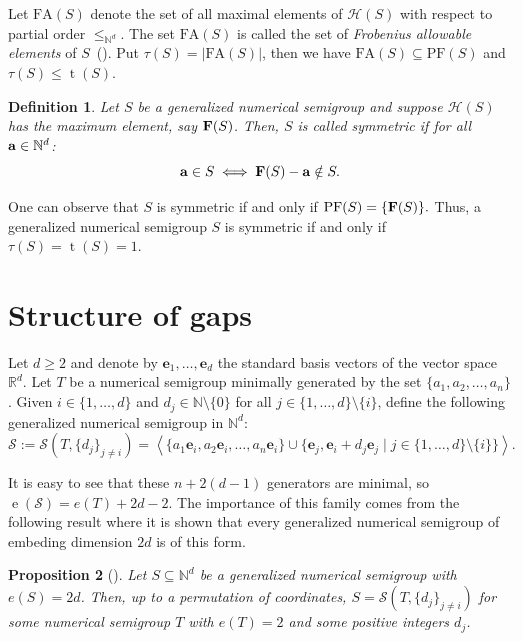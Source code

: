 \documentclass[12pt]{amsart}
\newcommand{\numberset}{\mathbb}
\newcommand{\N}{\numberset{N}}
\theoremstyle{plain}
\theoremstyle{theorem}
\newtheorem{definition}{Definition}[section]
\newtheorem{proposition}[definition]{Proposition}
\theoremstyle{remark}
\begin{document}
Let $\mathrm{FA}(S)$ denote the set of all maximal elements of $\mathcal{H}(S)$ with respect to partial order $\leq_{\mathbb{N}^d}$. The set $\mathrm{FA}(S)$ is called the set of \textit{Frobenius allowable elements} of $S$~(\cite{Singhal-Lin2022}). Put $\tau(S) = \vert \mathrm{FA}(S) \vert$, then we have $\mathrm{FA}(S)\subseteq  \mathrm{PF}(S)$ and $\tau(S) \leq \operatorname{t}(S)$.



\begin{definition}
	{\rm Let $S$ be a generalized numerical semigroup and suppose $\mathcal{H}(S)$ has the maximum element, say ${\bf F}(S)$. Then, $S$ is called \textit{symmetric}  if for all ${\bf a} \in \mathbb{N}^d$: $${\bf a} \in S \iff {\bf F}(S) - {\bf a} \notin S.$$
	}
\end{definition}

 One can observe that $S$ is symmetric if and only if $\mathrm{PF}(S) = \{{\bf F}(S)\}.$ Thus, a generalized numerical semigroup $S$ is symmetric if and only if  $\tau(S) = \operatorname{t}(S) = 1.$






\section{Structure of gaps}\label{sec:gaps}

Let $d\geq 2$ and denote by $\mathbf{e}_1,\ldots,\mathbf{e}_d$ the standard basis vectors of the vector space $\mathbb{R}^d$. Let $T$ be a numerical semigroup minimally generated by the set $\{a_1,a_2, \ldots,a_n\}$. 
Given $i\in \{1,\ldots,d\}$ and  $d_j\in \mathbb{N}\setminus \{0\}$ for all $j\in \{1,\ldots,d\}\setminus \{i\}$, define the following generalized numerical semigroup in $\mathbb{N}^d$:
$$\mathcal{S}:= \mathcal{S}(T,\{d_j\}_{j\neq i})=\left\langle \{a_1 \mathbf{e}_i, a_2 \mathbf{e}_i,\ldots, a_n \mathbf{e}_i\}\cup \{\mathbf{e}_j,\mathbf{e}_i+d_j\mathbf{e}_j\mid j\in \{1,\ldots,d\}\setminus \{i\}\}\right \rangle .$$

It is easy to see that these $n+2(d-1)$ generators are minimal, so $\operatorname{e}(\mathcal{S})=e(T)+2d-2$. The importance of this family comes from the following result where it is shown that every generalized numerical semigroup of embeding dimension $2d$ is of this form. 

\begin{proposition}[\cite{Bhardwaj-Cisto2025}]\label{prop:min-emb}
Let $S\subseteq\N^d$ be a generalized numerical semigroup with $e(S)=2d$. Then, up to a permutation of coordinates, $S=\mathcal{S}(T,\{d_j\}_{j\neq i})$ for some numerical semigroup $T$ with $e(T)=2$ and some positive integers $d_j$.
\end{proposition}
\end{document}
